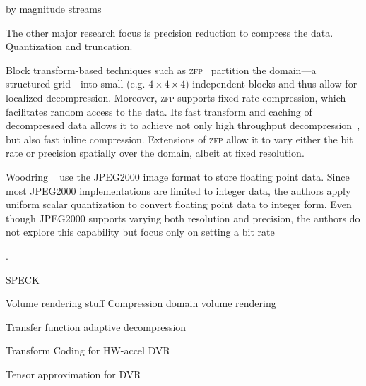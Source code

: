by magnitude streams~\cite{image_compression1992}



The other major research focus is precision reduction to compress the data. Quantization and
truncation.



\newcommand{\zfp}{\textsc{zfp}\xspace}
Block transform-based techniques such as \zfp~\cite{zfp2014} partition the
domain---a structured grid---into small (e.g. $4 \times 4 \times 4$)
independent blocks and thus allow for localized decompression. Moreover,
\zfp supports fixed-rate compression, which facilitates random access to
the data. Its fast transform and caching of decompressed data allows it to
achieve not only high throughput decompression~\cite{hvq}, but also fast
inline compression.
Extensions of \zfp allow it to vary either the bit rate or precision spatially
over the domain, albeit at fixed resolution.


Woodring \etal~\cite{woodring2011} use the JPEG2000 image format to store
floating point data.  Since most JPEG2000 implementations are limited
to integer data, the authors apply uniform scalar quantization to convert
floating point data to integer form. Even though JPEG2000 supports varying
both resolution and precision, the authors do not explore this capability
but focus only on setting a bit rate 

.


SPECK~\cite{speck2004}



Volume rendering stuff
Compression domain volume rendering~\cite{compression_domain2003}

Transfer function adaptive decompression~\cite{tf_decompression2004}

Transform Coding for HW-accel DVR~\cite{hw_dvr2007}

Tensor approximation for DVR~\cite{tensor_dvr2015}

